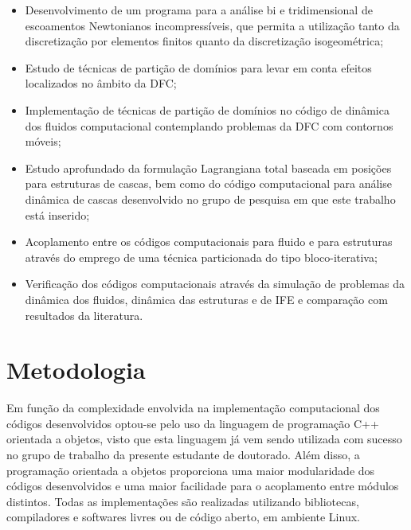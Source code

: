 \documentclass[tese_patricia.tex]{subfiles}
\begin{document}
\begin{itemize}
	\item Desenvolvimento de um programa para a análise bi e tridimensional de escoamentos Newtonianos incompressíveis, que permita a utilização tanto da discretização por elementos finitos quanto da discretização isogeométrica;

	\item Estudo de técnicas de partição de domínios para levar em conta efeitos localizados no âmbito da DFC;
	
	\item Implementação de técnicas de partição de domínios no código de dinâmica dos fluidos computacional contemplando problemas da DFC com contornos móveis;
	
	\item Estudo aprofundado da formulação Lagrangiana total baseada em posições para estruturas de cascas, bem como do código computacional para análise dinâmica de cascas desenvolvido no grupo de pesquisa em que este trabalho está inserido;
	
	\item Acoplamento entre os códigos computacionais para fluido e para estruturas através do emprego de uma técnica particionada do tipo bloco-iterativa;
	
	\item  Verificação dos códigos computacionais através da simulação de problemas da dinâmica dos fluidos, dinâmica das estruturas e de IFE e comparação com resultados da literatura.
	
\end{itemize}

\section[Metodologia]{Metodologia} 

Em função da complexidade envolvida na implementação computacional dos códigos desenvolvidos optou-se pelo uso da linguagem de programação C++ orientada a objetos, visto que esta linguagem já vem sendo utilizada com sucesso no grupo de trabalho da presente estudante de doutorado. Além disso, a programação orientada a objetos proporciona uma maior modularidade dos códigos desenvolvidos e uma maior facilidade para o acoplamento entre módulos distintos.  Todas as implementações são realizadas utilizando bibliotecas, compiladores e softwares livres ou de código aberto, em ambiente Linux.
\end{document}
